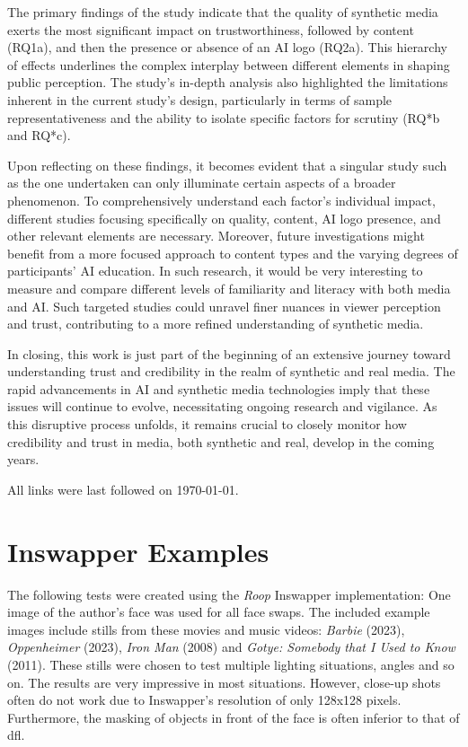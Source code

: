 \documentclass[
  a4paper,  %
  twoside,  %
  bibliography=totoc,
  headsepline,
  cleardoublepage=empty,
  parskip=half,
  draft=false
]{scrbook}
\begin{document}
The primary findings of the study indicate that the quality of synthetic media exerts the most significant impact on trustworthiness, followed by content (RQ1a), and then the presence or absence of an AI logo (RQ2a). This hierarchy of effects underlines the complex interplay between different elements in shaping public perception. The study's in-depth analysis also highlighted the limitations inherent in the current study's design, particularly in terms of sample representativeness and the ability to isolate specific factors for scrutiny (RQ*b and RQ*c).

Upon reflecting on these findings, it becomes evident that a singular study such as the one undertaken can only illuminate certain aspects of a broader phenomenon. To comprehensively understand each factor's individual impact, different studies focusing specifically on quality, content, AI logo presence, and other relevant elements are necessary. Moreover, future investigations might benefit from a more focused approach to content types and the varying degrees of participants' AI education. In such research, it would be very interesting to measure and compare different levels of familiarity and literacy with both media and AI. Such targeted studies could unravel finer nuances in viewer perception and trust, contributing to a more refined understanding of synthetic media.

In closing, this work is just part of the beginning of an extensive journey toward understanding trust and credibility in the realm of synthetic and real media. The rapid advancements in AI and synthetic media technologies imply that these issues will continue to evolve, necessitating ongoing research and vigilance. As this disruptive process unfolds, it remains crucial to closely monitor how credibility and trust in media, both synthetic and real, develop in the coming years.


\printbibliography
All links were last followed on \today{}.

\appendix
\chapter{Inswapper Examples}
\label{chap:insightface-demos}
The following tests were created using the \textit{Roop} Inswapper implementation: One image of the author's face was used for all face swaps. The included example images include stills from these movies and music videos: \textit{Barbie} (2023), \textit{Oppenheimer} (2023), \textit{Iron Man} (2008) and \textit{Gotye: Somebody that I Used to Know} (2011).
These stills were chosen to test multiple lighting situations, angles and so on. The results are very impressive in most situations. However, close-up shots often do not work due to Inswapper's resolution of only 128x128 pixels. Furthermore, the masking of objects in front of the face is often inferior to that of \gls{dfl}.
\end{document}
